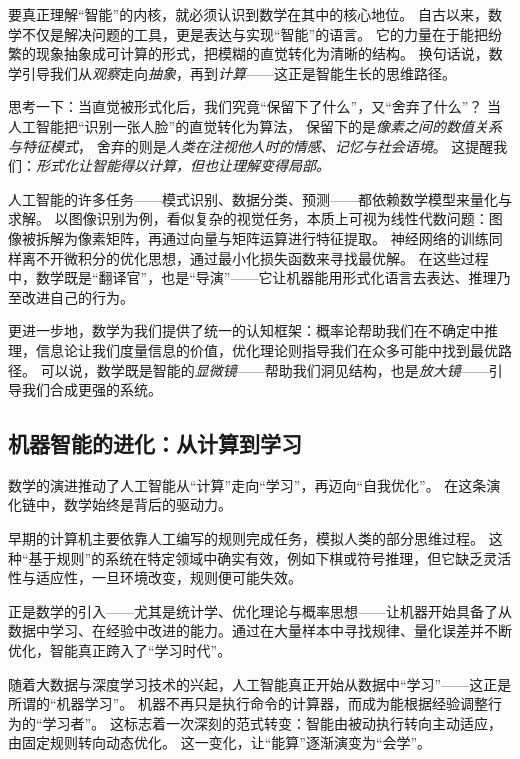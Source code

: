 要真正理解“智能”的内核，就必须认识到数学在其中的核心地位。
自古以来，数学不仅是解决问题的工具，更是表达与实现“智能”的语言。
它的力量在于能把纷繁的现象抽象成可计算的形式，把模糊的直觉转化为清晰的结构。
换句话说，数学引导我们从\emph{观察}走向\emph{抽象}，再到\emph{计算}——这正是智能生长的思维路径。

思考一下：当直觉被形式化后，我们究竟“保留下了什么”，又“舍弃了什么”？
当人工智能把“识别一张人脸”的直觉转化为算法，  
保留下的是\emph{像素之间的数值关系与特征模式}，  
舍弃的则是\emph{人类在注视他人时的情感、记忆与社会语境}。  
这提醒我们：\emph{形式化让智能得以计算，但也让理解变得局部。}  

人工智能的许多任务——模式识别、数据分类、预测——都依赖数学模型来量化与求解。
以图像识别为例，看似复杂的视觉任务，本质上可视为线性代数问题：图像被拆解为像素矩阵，再通过向量与矩阵运算进行特征提取。
神经网络的训练同样离不开微积分的优化思想，通过最小化损失函数来寻找最优解。
在这些过程中，数学既是“翻译官”，也是“导演”——它让机器能用形式化语言去表达、推理乃至改进自己的行为。

更进一步地，数学为我们提供了统一的认知框架：概率论帮助我们在不确定中推理，信息论让我们度量信息的价值，优化理论则指导我们在众多可能中找到最优路径。
可以说，数学既是智能的\emph{显微镜}——帮助我们洞见结构，也是\emph{放大镜}——引导我们合成更强的系统。

\subsection{机器智能的进化：从计算到学习}
数学的演进推动了人工智能从“计算”走向“学习”，再迈向“自我优化”。
在这条演化链中，数学始终是背后的驱动力。

早期的计算机主要依靠人工编写的规则完成任务，模拟人类的部分思维过程。
这种“基于规则”的系统在特定领域中确实有效，例如下棋或符号推理，但它缺乏灵活性与适应性，一旦环境改变，规则便可能失效。

正是数学的引入——尤其是统计学、优化理论与概率思想——让机器开始具备了从数据中学习、在经验中改进的能力。通过在大量样本中寻找规律、量化误差并不断优化，智能真正跨入了“学习时代”。

随着大数据与深度学习技术的兴起，人工智能真正开始从数据中“学习”——这正是所谓的“机器学习”。
机器不再只是执行命令的计算器，而成为能根据经验调整行为的“学习者”。
这标志着一次深刻的范式转变：智能由被动执行转向主动适应，由固定规则转向动态优化。
这一变化，让“能算”逐渐演变为“会学”。

